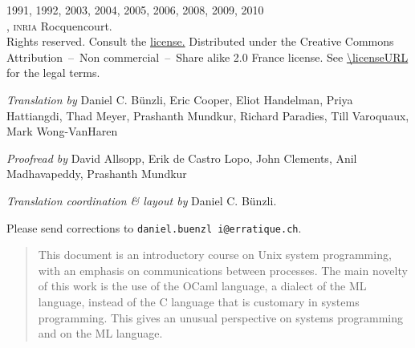 %
%

\maketitle
\newpage

\begin{copyrightnotice}
\textcopyright{} 1991, 1992, 2003, 2004, 2005, 2006, 2008, 2009, 2010 \\
\myauthors, \textsc{inria} Rocquencourt.\\
Rights reserved.
\ifhtmlelse
    {Consult the \href{LICENSE}{license.}  \href{\licenseURL}%
      {}
    }
    {Distributed under the Creative Commons Attribution~--~Non 
     commercial~--~Share alike 2.0 France license. See
     \url{\licenseURL} for the legal terms.}

\emph{Translation by} 
Daniel C. Bünzli, 
Eric Cooper,
Eliot Handelman,
Priya Hattiangdi,
Thad Meyer,
Prashanth Mundkur,
Richard Paradies,
Till Varoquaux,
Mark Wong-VanHaren

\emph{Proofread by}
David Allsopp,
Erik de Castro Lopo,
John Clements,
Anil Madhavapeddy,
Prashanth Mundkur

\emph{Translation coordination \& layout by} Daniel C. Bünzli.

Please send corrections to \texttt{daniel.buenzl i@erratique.ch}.
\end{copyrightnotice}


\vfill
\begin{abstract}
This document is an introductory course on Unix system programming,
with an emphasis on communications between processes. The main novelty
of this work is the use of the OCaml language, a dialect of the
ML language, instead of the C language that is customary in systems
programming. This gives an unusual perspective on systems programming
and on the ML language.
\end{abstract}
